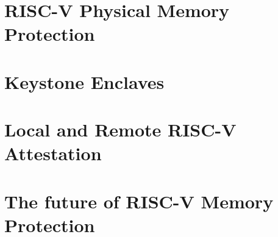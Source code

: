 \section{RISC-V Physical Memory Protection}
\section{Keystone Enclaves}
\section{Local and Remote RISC-V Attestation}
\section{The future of RISC-V Memory Protection}